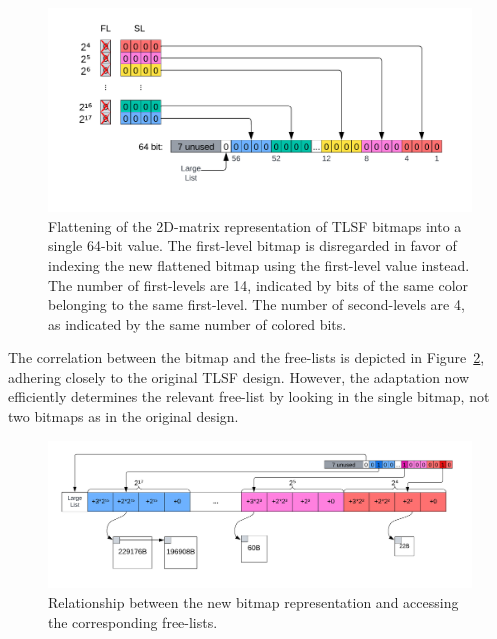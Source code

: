 \begin{figure}[H]
    \centering
    \includegraphics[width=1\textwidth]{figures/bitmap_flattening.png}
    \caption{Flattening of the 2D-matrix representation of TLSF bitmaps into a single 64-bit value. The first-level bitmap is disregarded in favor of indexing the new flattened bitmap using the first-level value instead. The number of first-levels are 14, indicated by bits of the same color belonging to the same first-level. The number of second-levels are 4, as indicated by the same number of colored bits.}
    \label{fig:bitmap_flattening}
\end{figure}

The correlation between the bitmap and the free-lists is depicted in Figure~\ref{fig:bitmap_relationship}, adhering closely to the original TLSF design. However, the adaptation now efficiently determines the relevant free-list by looking in the single bitmap, not two bitmaps as in the original design.

\begin{figure}[H]
    \centering
    \includegraphics[width=1\textwidth]{figures/bitmap_relationship.png}
    \caption{Relationship between the new bitmap representation and accessing the corresponding free-lists.}
    \label{fig:bitmap_relationship}
\end{figure}


